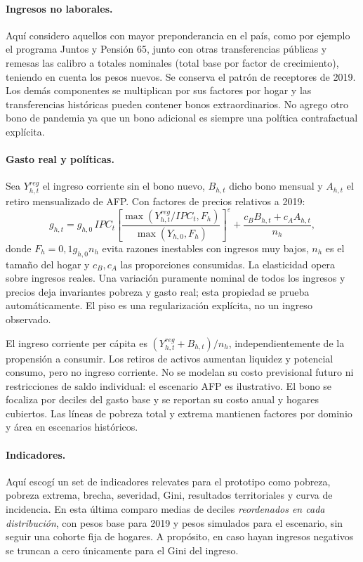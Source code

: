 \documentclass[11pt,a4paper]{article}
\begin{document}
\paragraph{Ingresos no laborales.} Aquí considero aquellos con mayor preponderancia en el país, como por ejemplo el programa Juntos y  Pensión 65, junto con otras transferencias públicas y remesas las calibro a totales nominales (total base por factor de crecimiento), teniendo en cuenta los pesos nuevos. Se conserva el patrón de receptores de 2019. Los demás componentes se multiplican por sus factores por hogar y las transferencias históricas pueden contener bonos extraordinarios. No agrego otro bono de pandemia ya que un bono adicional es siempre una política contrafactual explícita.

\paragraph{Gasto real y políticas.} Sea \(Y_{h,t}^{reg}\) el ingreso corriente sin el bono nuevo, \(B_{h,t}\) dicho bono mensual y \(A_{h,t}\) el retiro mensualizado de AFP. Con factores de precios relativos a 2019:
\[
g_{h,t}=g_{h,0}\,IPC_t
\left[\frac{\max(Y_{h,t}^{reg}/IPC_t,F_h)}{\max(Y_{h,0},F_h)}\right]^\varepsilon
+\frac{c_B B_{h,t}+c_A A_{h,t}}{n_h},
\]
donde \(F_h=0{,}1g_{h,0}n_h\) evita razones inestables con ingresos muy bajos, \(n_h\) es el tamaño del hogar y \(c_B,c_A\) las proporciones consumidas. La elasticidad opera sobre ingresos reales. Una variación puramente nominal de todos los ingresos y precios deja invariantes pobreza y gasto real; esta propiedad se prueba automáticamente. El piso es una regularización explícita, no un ingreso observado.

El ingreso corriente per cápita es \((Y_{h,t}^{reg}+B_{h,t})/n_h\), independientemente de la propensión a consumir. Los retiros de activos aumentan liquidez y potencial consumo, pero no ingreso corriente. No se modelan su costo previsional futuro ni restricciones de saldo individual: el escenario AFP es ilustrativo. El bono se focaliza por deciles del gasto base y se reportan su costo anual y hogares cubiertos. Las líneas de pobreza total y extrema mantienen factores por dominio y área en escenarios históricos.

\paragraph{Indicadores.} Aquí escogí un set de indicadores relevates para el prototipo como pobreza, pobreza extrema, brecha, severidad, Gini, resultados territoriales y curva de incidencia. En esta última comparo medias de deciles \emph{reordenados en cada distribución}, con pesos base para 2019 y pesos simulados para el escenario, sin seguir una cohorte fija de hogares. A propósito, en caso hayan ingresos negativos se truncan a cero únicamente para el Gini del ingreso.
\end{document}
